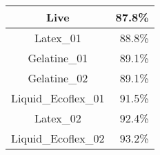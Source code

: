 \begin{tabular}{ c   r }
    Live                & 87.8\% \\ \hline\hline
    Latex\_01           & 88.8\% \\
    Gelatine\_01        & 89.1\% \\
    Gelatine\_02        & 89.1\% \\
    Liquid\_Ecoflex\_01 & 91.5\% \\
    Latex\_02           & 92.4\% \\
    Liquid\_Ecoflex\_02 & 93.2\% \\
\end{tabular}
